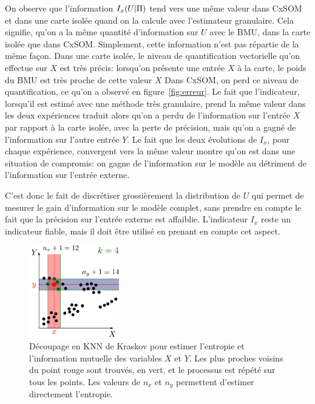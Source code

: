 On observe que l'information $I_x(U|\Pi)$ tend vers une même valeur dans CxSOM et dans une carte isolée quand on la calcule avec l'estimateur granulaire. Cela signifie, qu'on a la même quantité d'information sur $U$ avec le BMU, dans la carte isolée que dans CxSOM. Simplement, cette information n'est pas répartie de la même façon. 
Dans une carte isolée, le niveau de quantification vectorielle qu'on effectue sur $X$ est très précis: lorsqu'on présente une entrée $X$ à la carte, le poids du BMU est très proche de cette valeur $X$ Dans CxSOM, on perd ce niveau de quantification, ce qu'on a observé en figure~\ref{fig:erreur}. Le fait que l'indicateur, lorsqu'il est estimé avec une méthode très granulaire, prend la même valeur dans les deux expériences traduit alors qu'on a perdu de l'information sur l'entrée $X$ par rapport à la carte isolée, avec la perte de précision, mais qu'on a gagné de l'information sur l'autre entrée $Y$. Le fait que les deux évolutions de $I_x$, pour chaque expérience, convergent vers la même valeur montre qu'on est dans une situation de compromis: on gagne de l'information sur le modèle au détriment de l'information sur l'entrée externe.

C'est donc le fait de discrétiser grossièrement la distribution de $U$ qui permet de mesurer le gain d'information sur le modèle complet, sans prendre en compte le fait que la précision sur l'entrée externe est affaiblie. L'indicateur $I_x$ reste un indicateur fiable, mais il doit être utilisé en prenant en compte cet aspect.




\begin{figure}
    \centering
    \includegraphics[width=0.35\textwidth]{kraskov.pdf}
    \caption{Découpage en KNN de Kraskov pour estimer l'entropie et l'information mutuelle des variables $X$ et $Y$. Les plus proches voisins du point rouge sont trouvés, en vert, et le processus est répété sur tous les points. Les valeurs de $n_x$ et $n_y$ permettent d'estimer directement l'entropie.}
    \label{fig:kraskov}
\end{figure}

